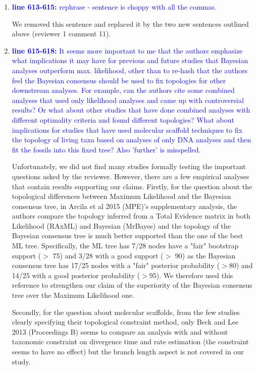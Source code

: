 \documentclass[12pt,letterpaper]{article}
\begin{document}
\begin{enumerate}
\item{\textcolor{blue}{\textbf{line 613-615:} rephrase - sentence is choppy with all the commas. }}

We removed this sentence and replaced it by the two new sentences outlined above (reviewer 1 comment 11).

\item{\textcolor{blue}{\textbf{line 615-618:} It seems more important to me that the authors emphasize what implications it may have for previous and future studies that Bayesian analyses outperform max. likelihood, other than to re-hash that the authors feel the Bayesian consensus should be used to fix topologies for other downstream analyses.
For example, can the authors cite some combined analyses that used only likelihood analyses and came up with controversial results?
Or what about other studies that have done combined analyses with different optimality criteria and found different topologies?
What about implications for studies that have used molecular scaffold techniques to fix the topology of living taxa based on analyses of only DNA analyses and then fit the fossils into this fixed tree?
Also 'further' is misspelled.  }}

Unfortunately, we did not find many studies formally testing the important questions asked by the reviewer. However, there are a few empirical analyses that contain results supporting our claims.
Firstly, for the question about the topological differences between Maximum Likelihood and the Bayesian consensus tree, in Arcila et al 2015 (MPE)'s supplementary analysis, the authors compare the topology inferred from a Total Evidence matrix in both Likelihood (RAxML) and Bayesian (MrBayes) and the topology of the Bayesian consensus tree is much better supported than the one of the best ML tree. Specifically, the ML tree has 7/28 nodes have a "fair" bootstrap support ($>$ 75) and 3/28 with a good support ($>$ 90) as the Bayesian consensus tree has 17/25 nodes with a "fair" posterior probability ($>$80) and 14/25 with a good posterior probability ($>$95). We therefore used this reference to strengthen our claim of the superiority of the Bayesian consensus tree over the Maximum Likelihood one.

Secondly, for the question about molecular scaffolds, from the few studies clearly specifying their topological constraint method, only Beck and Lee 2013 (Proceedings B) seems to compare an analysis with and without taxonomic constraint on divergence time and rate estimation (the constraint seems to have no effect) but the branch length aspect is not covered in our study.


\end{enumerate}
\end{document}
